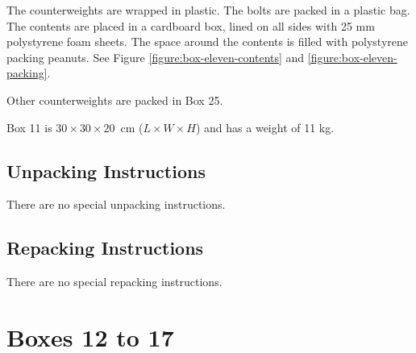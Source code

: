 \documentclass{article}
\begin{document}
The counterweights are wrapped in plastic. The bolts are packed in a plastic bag. The contents are placed in a cardboard box, lined on all sides with 25 mm polystyrene foam sheets. The space around the contents is filled with polystyrene packing peanuts. See Figure \ref{figure:box-eleven-contents} and \ref{figure:box-eleven-packing}.

Other counterweights are packed in Box 25.

Box 11 is $30 \times 30 \times 20$~cm ($L \times W \times H$) and has a weight of 11 kg.

\subsection{Unpacking Instructions}

There are no special unpacking instructions.

\subsection{Repacking Instructions}

There are no special repacking instructions.



\clearpage
\section{Boxes 12 to 17}
\end{document}

